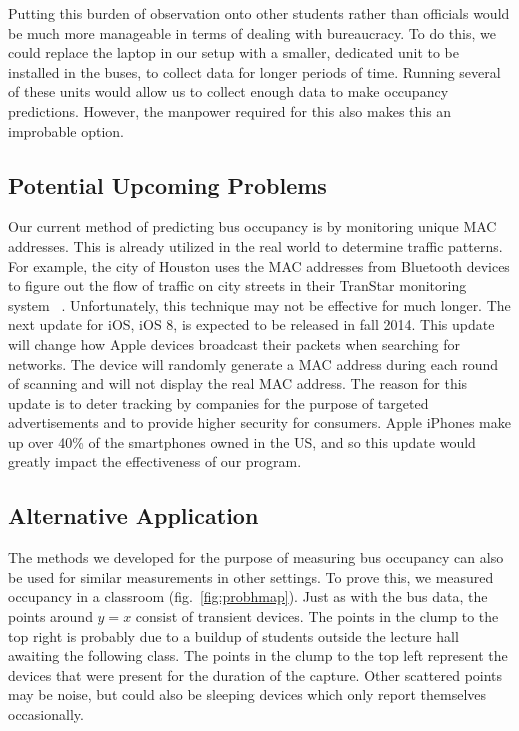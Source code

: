 Putting this burden of observation onto other students rather than officials would be much more manageable in terms of dealing with bureaucracy.
To do this, we could replace the laptop in our setup with a smaller, dedicated unit to be installed in the buses, to collect data for longer periods of time.
Running several of these units would allow us to collect enough data to make occupancy predictions.
However, the manpower required for this also makes this an improbable option.

\subsection{Potential Upcoming Problems}
Our current method of predicting bus occupancy is by monitoring unique MAC addresses.
This is already utilized in the real world to determine traffic patterns.
For example, the city of Houston uses the MAC addresses from Bluetooth devices to figure out the flow of traffic on city streets in their TranStar monitoring system ~\cite{ios8-privacy}.
Unfortunately, this technique may not be effective for much longer.
The next update for iOS, iOS 8, is expected to be released in fall 2014.
This update will change how Apple devices broadcast their packets when searching for networks.
The device will randomly generate a MAC address during each round of scanning and will not display the real MAC address.
The reason for this update is to deter tracking by companies for the purpose of targeted advertisements and to provide higher security for consumers.
Apple iPhones make up over 40\% of the smartphones owned in the US, and so this update would greatly impact the effectiveness of our program.

\subsection{Alternative Application}
The methods we developed for the purpose of measuring bus occupancy can also be used for similar measurements in other settings.
To prove this, we measured occupancy in a classroom (fig.~\ref{fig:probhmap}).
Just as with the bus data, the points around \(y=x\) consist of transient devices.
The points in the clump to the top right is probably due to a buildup of students outside the lecture hall awaiting the following class.
The points in the clump to the top left represent the devices that were present for the duration of the capture.
Other scattered points may be noise, but could also be sleeping devices which only report themselves occasionally.


